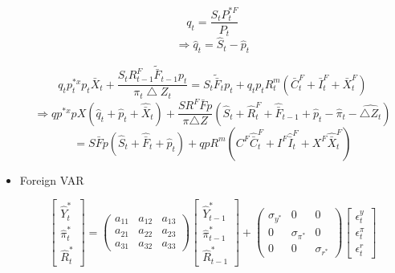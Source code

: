 \documentclass[11pt, a4paper]{article}
\begin{document}
\begin{itemize}
\[ q_t = \frac{S_t P_t^{*F}} {P_t}  \]
\begin{equation}\Rightarrow \hat{q}_t = \hat{S}_t  - \hat{p}_t \end{equation}

\[
 {q_t p_t^{*x}p_t\bar{X}_t} + \frac{S_t R_{t-1}^F \tilde{\bar{F}}_{t-1}p_t}{ \pi_t \bigtriangleup Z_t} = {S_t \tilde{\bar{F}}_t p_t} + {q_t p_t R_t^m }(\bar{C}_t^F + \bar{I}_t^F + \bar{X}_t^F)
\]
\begin{equation*}
\Rightarrow qp^{*x}pX(\widehat{q}_t + \widehat{p}_t + \widehat{\bar{X}}_t) + \frac{SR^F\bar{F} p}{\pi {\bigtriangleup Z}}(\widehat{S}_t + \widehat{R}_t^F + \widehat{\bar{F}}_{t-1} + \widehat{p}_t - \widehat{\pi}_t - \widehat{\bigtriangleup Z_t})
\end{equation*}
\begin{equation}
= S\bar{F}p(\widehat{S}_t + \widehat{\bar{F}}_t + \widehat{p}_t) + qpR^m(C^F \widehat{\bar{C}}_t^F + I^F \widehat{\bar{I}}_t^F + X^F \widehat{\bar{X}}_t^F)
\end{equation}
\item Foreign VAR

\begin{equation} \begin{bmatrix} \widehat{Y}_t^* \\ \widehat{\pi}_t^* \\ \widehat{R}_t^* \end{bmatrix} = 
\begin{pmatrix}
a_{11} & a_{12} & a_{13} \\
a_{21} & a_{22} & a_{23} \\
a_{31} & a_{32} & a_{33} 
\end{pmatrix} 
\begin{bmatrix} \widehat{Y}_{t-1}^* \\ \widehat{\pi}_{t-1}^* \\ \widehat{R}_{t-1}^* \end{bmatrix}
+ \begin{pmatrix}
\sigma_{y^*} & 0 & 0 \\
0 & \sigma_{\pi^*} & 0 \\
0 & 0 & \sigma_{r^*} 
\end{pmatrix} \begin{bmatrix}
\epsilon_t^y \\
\epsilon_t^{\pi} \\
\epsilon_t^r 
\end{bmatrix} \end{equation}


\end{itemize}
\pagebreak
\end{document}
